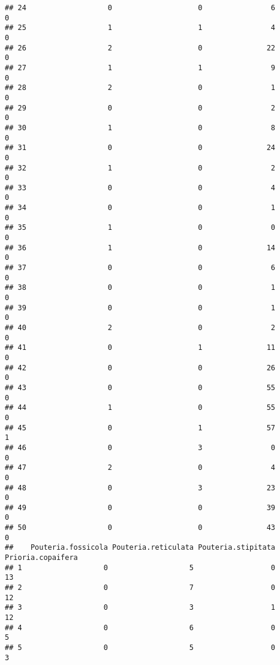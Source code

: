 \documentclass[
]{article}
\begin{document}
\begin{verbatim}
## 24                   0                    0                6                0
## 25                   1                    1                4                0
## 26                   2                    0               22                0
## 27                   1                    1                9                0
## 28                   2                    0                1                0
## 29                   0                    0                2                0
## 30                   1                    0                8                0
## 31                   0                    0               24                0
## 32                   1                    0                2                0
## 33                   0                    0                4                0
## 34                   0                    0                1                0
## 35                   1                    0                0                0
## 36                   1                    0               14                0
## 37                   0                    0                6                0
## 38                   0                    0                1                0
## 39                   0                    0                1                0
## 40                   2                    0                2                0
## 41                   0                    1               11                0
## 42                   0                    0               26                0
## 43                   0                    0               55                0
## 44                   1                    0               55                0
## 45                   0                    1               57                1
## 46                   0                    3                0                0
## 47                   2                    0                4                0
## 48                   0                    3               23                0
## 49                   0                    0               39                0
## 50                   0                    0               43                0
##    Pouteria.fossicola Pouteria.reticulata Pouteria.stipitata Prioria.copaifera
## 1                   0                   5                  0                13
## 2                   0                   7                  0                12
## 3                   0                   3                  1                12
## 4                   0                   6                  0                 5
## 5                   0                   5                  0                 3

\end{verbatim}
\end{document}
